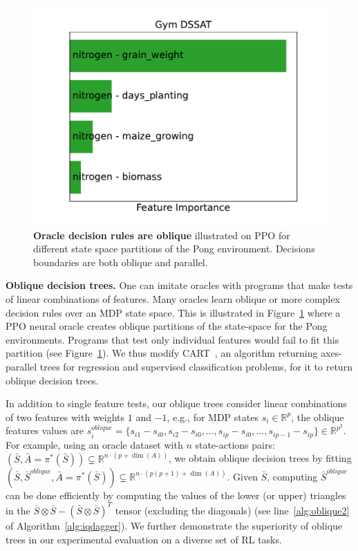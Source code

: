 \begin{figure}[b]
    \centering
    \includegraphics[width=1.\textwidth]{images/images_part3/fi_dssat_copy_human.pdf}
    \caption{\textbf{Oracle decision rules are oblique} illustrated on PPO for different state space partitions of the Pong environment. Decisions boundaries are both oblique and parallel.}
    \label{fig:pong_states}
\end{figure}

\textbf{Oblique decision trees.} One can imitate oracles with programs that make tests of linear combinations of features. Many oracles learn oblique or more complex decision rules over an MDP state space. This is illustrated in Figure~\ref{fig:pong_states} where a PPO neural oracle creates oblique partitions of the state-space for the Pong environments. Programs that test only individual features would fail to fit this partition (see Figure~\ref{fig:pong_states}). 
We thus modify CART~\citep{breiman}, an algorithm returning axes-parallel trees for regression and supervised classification problems, for it to return oblique decision trees. 

In addition to single feature tests, our oblique trees consider linear combinations of two features with weights $1$ and $-1$, e.g., for MDP states $s_i \in \mathbb{R}^{p}$, the oblique features values are $s^{oblique}_i = \{s_{i1} - s_{i0}, s_{i2} - s_{i0}, \ldots, s_{ip} - s_{i0}, \ldots, s_{ip-1} - s_{ip}\} \in \mathbb{R}^{p^2}$. For example, using an oracle dataset with $n$ state-actions pairs: $(\bar{S}, \bar{A} = \pi^{*}(\bar{S})) \subsetneq \mathbb{R}^{n\cdot(p+\dim(A))}$, we obtain oblique decision trees by fitting $(\bar{S},\bar{S}^{oblique} , \bar{A} = \pi^{*}(\bar{S})) \subsetneq \mathbb{R}^{n\cdot(p(p+1)+\dim(A))}$. 
Given $\bar{S}$, computing $\bar{S}^{oblique}$ can be done efficiently by computing the values of the lower (or upper) triangles in the $\bar{S} \otimes \bar{S} - (\bar{S} \otimes \bar{S})^T$ tensor (excluding the diagonals) (see line~\ref{alg:oblique2} of Algorithm~\ref{alg:iqdagger}). We further demonstrate the superiority of oblique trees in our experimental evaluation on a diverse set of RL tasks.

